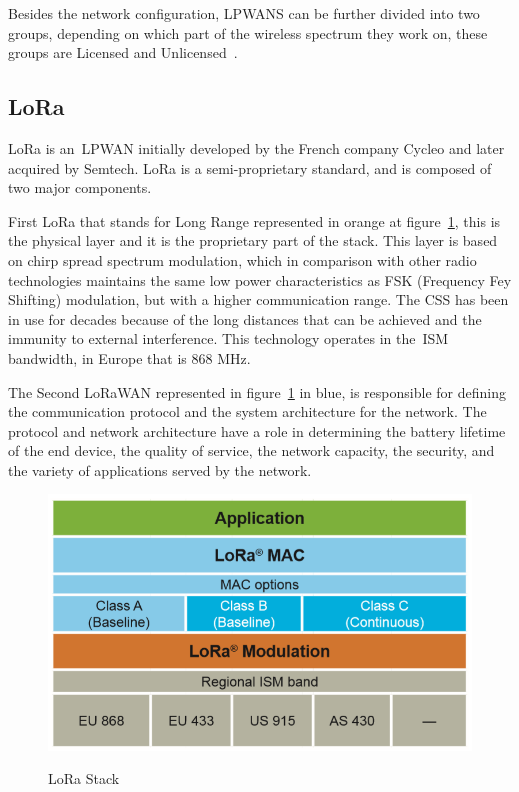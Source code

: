 Besides the network configuration, LPWANS can be further divided into two groups, depending on which part of the wireless spectrum they work on, these groups are Licensed and Unlicensed~\cite{LPZourmand2019}.



\subsection{LoRa} %
\label{sec:lora_sota}

LoRa is an~\gls{LPWAN} initially developed by the French company Cycleo and later acquired by Semtech. LoRa is a semi-proprietary standard, and is composed of two major components. 

First LoRa that stands for Long Range represented in orange at figure~\ref{fig:lora_intro}, this is the physical layer and it is the proprietary part of the stack. This layer  is based on chirp spread spectrum modulation, which in comparison with other radio technologies maintains the same low power characteristics as FSK (Frequency Fey Shifting) modulation, but with a higher communication range. The CSS has been in use for decades because of the long distances that can be achieved and the immunity to external interference. This technology operates in the~\gls{ISM} bandwidth, in Europe that is 868 MHz. 

The Second LoRaWAN represented in figure~\ref{fig:lora_intro} in blue, is responsible for defining the communication protocol and the system architecture for the network. The protocol and network architecture have a role in determining the battery lifetime of the end device, the quality of service, the network capacity, the security, and the variety of applications served by the network.

\begin{figure}[htbp]
  \centering
    {\includegraphics[width=0.6\linewidth]{Chapters/Figures/introlora.PNG}}%
  \caption{LoRa Stack~\cite{What_is_LoRa}}
  \label{fig:lora_intro}
\end{figure}

